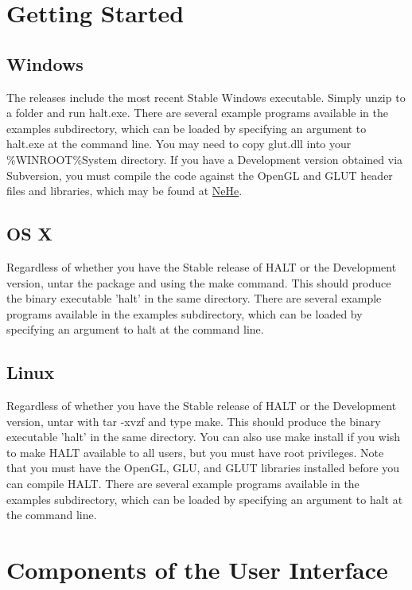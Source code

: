 \documentclass[10pt,fullpage]{article}
\begin{document}
\section*{Getting Started}
\subsection*{Windows}
The releases include the most recent Stable Windows executable.
Simply unzip to a folder and run halt.exe. There are several example
programs available in the examples subdirectory, which can be loaded
by specifying an argument to halt.exe at the command line. You may
need to copy glut.dll into your \%WINROOT\%System directory. If you
have a Development version obtained via Subversion, you must compile
the code against the OpenGL and GLUT header files and libraries,
which may be found at
\href{http://nehe.gamedev.org}{NeHe}.\\

\subsection*{OS X}
Regardless of whether you have the Stable release of HALT or the
Development version, untar the package and using the make command.
This should produce the binary executable 'halt' in the same
directory. There are several example programs available in the
examples subdirectory, which can be loaded by specifying an argument
to halt at the command line.

\subsection*{Linux}
Regardless of whether you have the Stable release of HALT or the
Development version, untar with tar -xvzf and type make. This should
produce the binary executable 'halt' in the same directory. You can
also use make install if you wish to make HALT available to all
users, but you must have root privileges. Note that you must have
the OpenGL, GLU, and GLUT libraries installed before you can compile
HALT. There are several example programs available in the examples
subdirectory, which can be loaded by specifying an argument to halt
at the command line.


\section*{Components of the User Interface}
\end{document}
